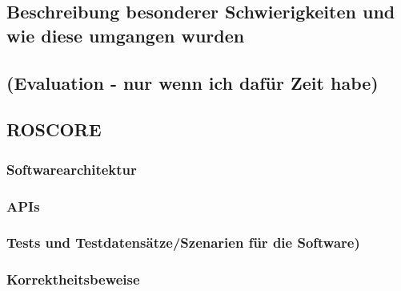 \subsection{Beschreibung besonderer Schwierigkeiten und wie diese umgangen wurden}
\subsection{(Evaluation - nur wenn ich dafür Zeit habe)}
\subsection{ROSCORE}
\subsubsection{Softwarearchitektur}
\subsubsection{APIs}

\subsubsection{Tests und Testdatensätze/Szenarien für die Software)}
\subsubsection{Korrektheitsbeweise}
